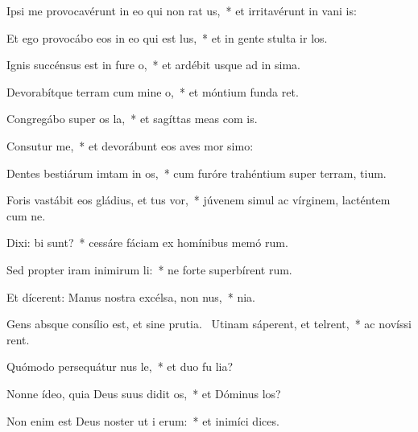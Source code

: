 \item Ipsi me provocavérunt in eo qui non rat us,~* et irritavérunt in vani is:
\item Et ego provocábo eos in eo qui  est lus,~* et in gente stulta ir los.
\item Ignis succénsus est in fure o,~* et ardébit usque ad in sima.
\item Devorabítque terram cum mine o,~* et móntium funda ret.
\item Congregábo super os la,~* et sagíttas meas com  is.
\item Consutur me,~* et devorábunt eos aves mor simo:
\item Dentes bestiárum imtam in os,~* cum furóre trahéntium super terram,  tium.
\item Foris vastábit eos gládius, et tus vor,~* júvenem simul ac vírginem, lacténtem cum  ne.
\item Dixi: bi sunt?~* cessáre fáciam ex homínibus memó rum.
\item Sed propter iram inimirum li:~* ne forte superbírent  rum.
\item Et dícerent: Manus nostra excélsa,  non nus,~*   nia.
\item Gens absque consílio est, et sine prutia.~\pscross{} Utinam sáperent, et telrent,~* ac novíssi rent.
\item Quómodo persequátur nus le,~* et duo fu  lia?
\item Nonne ídeo, quia Deus suus didit os,~* et Dóminus  los?
\item Non enim est Deus noster ut i erum:~* et inimíci   dices.
